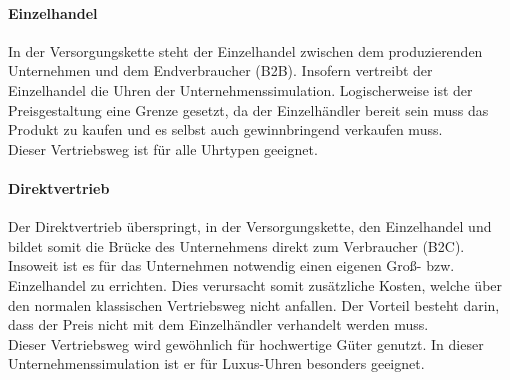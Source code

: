 \paragraph{Einzelhandel}
In der Versorgungskette steht der Einzelhandel zwischen dem produzierenden Unternehmen und dem Endverbraucher (B2B). Insofern vertreibt der Einzelhandel die Uhren der Unternehmenssimulation. Logischerweise ist der Preisgestaltung eine Grenze gesetzt, da der Einzelhändler bereit sein muss das Produkt zu kaufen und es selbst auch gewinnbringend verkaufen muss. \\
Dieser Vertriebsweg ist für alle Uhrtypen geeignet. 

\paragraph{Direktvertrieb}
Der Direktvertrieb überspringt, in der Versorgungskette, den Einzelhandel und bildet somit die Brücke des Unternehmens direkt zum Verbraucher (B2C). Insoweit ist es für das Unternehmen notwendig einen eigenen Groß- bzw. Einzelhandel zu errichten. Dies verursacht somit zusätzliche Kosten, welche über den normalen klassischen Vertriebsweg nicht anfallen. Der Vorteil besteht darin, dass der Preis nicht mit dem Einzelhändler verhandelt werden muss. \\
Dieser Vertriebsweg wird gewöhnlich für hochwertige Güter genutzt. In dieser Unternehmenssimulation ist er für Luxus-Uhren besonders geeignet.


